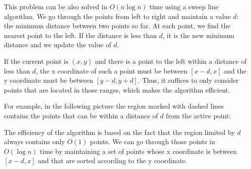 This problem can be also solved in $O(n \log n)$ time
using a sweep line algorithm.
We go through the points from left to right
and maintain a value $d$: the minimum distance
between two points so far.
At each point, we find the nearest point to the left.
If the distance is less than $d$, it is the
new minimum distance and we update
the value of $d$.

If the current point is $(x,y)$
and there is a point to the left
within a distance of less than $d$,
the x coordinate of such a point must
be between $[x-d,x]$ and the y coordinate
must be between $[y-d,y+d]$.
Thus, it suffices to only consider points
that are located in those ranges,
which makes the algorithm efficient.

For example, in the following picture the
region marked with dashed lines contains
the points that can be within a distance of $d$
from the active point:
\\
\begin{center}
\end{center}

The efficiency of the algorithm is based on the fact
that the region limited by $d$ always contains
only $O(1)$ points.
We can go through those points in $O(\log n)$ time
by maintaining a set of points whose x coordinate
is between $[x-d,x]$ and that are sorted according
to the y coordinate.

